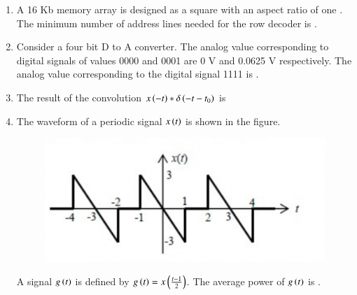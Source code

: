 \documentclass[a4paper, 11pt]{article}
\begin{document}
\begin{enumerate}
    \hfill{}

    \item A 16 Kb  memory array is designed as a square with an aspect ratio of one . The minimum number of address lines needed for the row decoder is \underline{\hspace{2cm}}.
    
    \hfill{}

    \item Consider a four bit D to A converter. The analog value corresponding to digital signals of values 0000 and 0001 are 0 V and 0.0625 V respectively. The analog value  corresponding to the digital signal 1111 is \underline{\hspace{2cm}}.
    
    \hfill{}

    \item The result of the convolution $x\left(-t\right)*\delta\left(-t-t_{0}\right)$ is
    \begin{enumerate}
    \end{enumerate}
    
    \hfill{}

    \item The waveform of a periodic signal $x\left(t\right)$ is shown in the figure.
    \begin{figure}[H]
        \centering
        \includegraphics[width=0.5\columnwidth]{figs/q28.png}
        \caption*{}
        \label{fig:q28}
    \end{figure}
    A signal $g\left(t\right)$ is defined by $g\left(t\right)=x\left(\frac{t-1}{2}\right)$. The average power of $g\left(t\right)$ is \underline{\hspace{2cm}}.
    

\end{enumerate}
\end{document}
